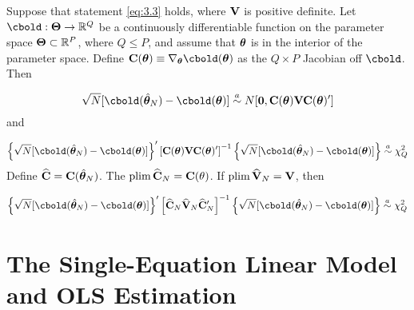\documentclass[11pt, oneside, a4paper, article]{article}
\numberwithin{equation}{section}
\begin{document}
\begin{lem} 
	Suppose that statement \eqref{eq:3.3} holds, where $\mathbf{V}$ is positive definite.
	Let $\cbold: \Thetabold \to \R^{Q}$ be a continuously differentiable function on the parameter space $\boldsymbol{\Theta} \subset \mathbb{R}^{P}$, where $Q \leq P$, and assume that $\boldsymbol{\theta}$ is in the interior of the parameter space.
	Define $\Cbold(\thetabold) \equiv \nabla_{\thetabold} \cbold(\thetabold)$ as the $Q \times P$ Jacobian off $\cbold$. Then

\begin{equation}
	\sqrt{N}[ \cbold( \thetahatbold_{N} ) - \cbold( \thetabold ) ]
	\asim
	N[ \mbs{0}, \Cbold(\thetabold) \Vbold \Cbold(\thetabold) ']
\end{equation}
and

\begin{equation*}
\left\{  \sqrt{N}[ \cbold( \thetahatbold_{N} ) - \cbold( \thetabold ) ]\right\}'
\left[ \Cbold(\thetabold) \Vbold \Cbold(\thetabold)' \right]^{-1}
\left\{  \sqrt{N}[ \cbold( \thetahatbold_{N} ) - \cbold( \thetabold ) ]\right\}
\asim \chisq_{Q}
\end{equation*}
Define
$\widehat{\mathbf{C}} = \mathbf{C}(\hat{\boldsymbol{\theta}}_{N})$.
The $\text{plim} \, \widehat{\mathbf{C}}_{N} = \mathbf{C}(\theta)$.
If $\text{plim} \, \widehat{\mathbf{V}}_{N} = \mathbf{V}$, then

\begin{equation}
\left\{  \sqrt{N}[ \cbold( \thetahatbold_{N} ) - \cbold( \thetabold ) ]\right\}'
\left[ \Chatbold_{N} \Vhatbold_{N} \Chatbold_{N}' \right]^{-1}
\left\{  \sqrt{N}[ \cbold( \thetahatbold_{N} ) - \cbold( \thetabold ) ]\right\}
\asim \chisq_{Q}
\end{equation}
\end{lem}

\clearpage
\section{The Single-Equation Linear Model and OLS Estimation}

\noindent
\citet[C.4 p.49--76]{wool-2010}
\end{document}
